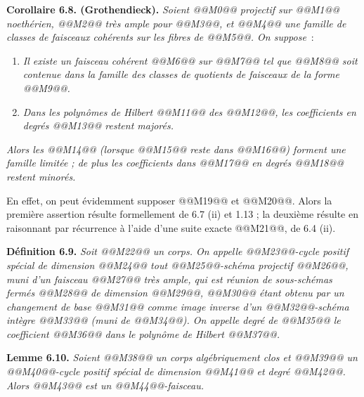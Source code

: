 
\textbf{Corollaire 6.8. (Grothendieck).} \emph{Soient @@M0@@ projectif sur @@M1@@ noeth\'erien, @@M2@@ tr\`es ample pour @@M3@@, et @@M4@@ une famille de classes de faisceaux coh\'erents sur les fibres de @@M5@@. On suppose}~:
\begin{enumerate}[label=(\alph*)]
\item \emph{Il existe un faisceau coh\'erent @@M6@@ sur @@M7@@ tel que @@M8@@ soit contenue dans la famille des classes de quotients de faisceaux de la forme @@M9@@.}
\item[@@M10@@] \emph{Dans les polyn\^omes de Hilbert @@M11@@ des @@M12@@, les coefficients en degr\'es @@M13@@ restent major\'es.}
\end{enumerate}
\emph{Alors les @@M14@@ (lorsque @@M15@@ reste dans @@M16@@) forment une famille limit\'ee ; de plus les coefficients dans @@M17@@ en degr\'es @@M18@@ restent minor\'es.}

En effet, on peut \'evidemment supposer @@M19@@ et @@M20@@. Alors la premi\`ere assertion r\'esulte formellement de 6.7 (ii) et 1.13 ; la deuxi\`eme r\'esulte en raisonnant par r\'ecurrence \`a l'aide d'une suite exacte @@M21@@, de 6.4 (ii).

\textbf{D\'efinition 6.9.} \emph{Soit @@M22@@ un corps. On appelle \emph{@@M23@@-cycle positif sp\'ecial de dimension @@M24@@} tout @@M25@@-sch\'ema projectif @@M26@@, muni d'un faisceau @@M27@@ tr\`es ample, qui est r\'eunion de sous-sch\'emas ferm\'es @@M28@@ de dimension @@M29@@, @@M30@@ \'etant obtenu par un changement de base @@M31@@ comme image inverse d'un @@M32@@-sch\'ema \emph{int\`egre} @@M33@@ (muni de @@M34@@). On appelle \emph{degr\'e} de @@M35@@ le coefficient @@M36@@ dans le polyn\^ome de Hilbert @@M37@@.}

\textbf{Lemme 6.10.} \emph{Soient @@M38@@ un corps alg\'ebriquement clos et @@M39@@ un @@M40@@-cycle positif sp\'ecial de dimension @@M41@@ et degr\'e @@M42@@. Alors @@M43@@ est un @@M44@@-faisceau.}

